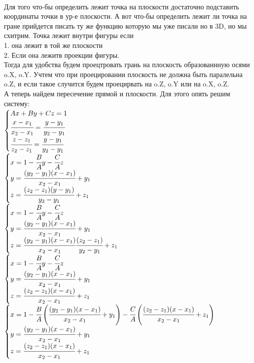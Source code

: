 \documentclass[12pt]{article} %
\begin{document}
    \\
    Для того что-бы определить лежит точка на плоскости достаточно подставить координаты точки в ур-е плоскости. А вот что-бы определить лежит ли точка на гране прийдется писать ту же функцию которую мы уже писали но в 3D, но мы схитрим. Точка лежит внутри фигуры если\\ \hspace*{2cm} 1. она лежит в той же плоскости \\  \hspace*{2cm} 2. Если она лежитв проекции фигуры.\\ Тогда для удобства будем проецтровать грань на плоскость образованнную осями o.X, o.Y. Учтем что при проецировании плоскость не должна быть паралельна o.Z, и если такое случится будем проецирвать на o.Z, o.Y или на o.X, o.Z.\\
    \hspace*{1cm} А теперь найдем пересечение прямой и плоскости. Для этого опять решим систему: \\ $ \begin{cases}Ax + By + Cz = 1 \\ \cfrac{x-x_1}{x_2 - x_1} = \cfrac{y-y_1}{y_2 - y_1} \\ \cfrac{z-z_1}{z_2 - z_1} = \cfrac{y-y_1}{y_2 - y_1}  \end{cases}$\\
    $ \begin{cases}x = 1 - \cfrac{B}{A}y - \cfrac{C}{A}z  \\  y = \cfrac{(y_2 - y_1)(x-x_1)}{x_2 - x_1} + y_1 \\ z = \cfrac{(z_2 - z_1)(y-y_1)}{y_2 - y_1} + z_1  \end{cases}$\\
    $ \begin{cases}x = 1 - \cfrac{B}{A}y - \cfrac{C}{A}z  \\  y = \cfrac{(y_2 - y_1)(x-x_1)}{x_2 - x_1} + y_1 \\ z = \cfrac{(y_2 - y_1)(x-x_1)}{x_2 - x_1}\cfrac{(z_2 - z_1)}{y_2 - y_1} + z_1  \end{cases}$\\
     $ \begin{cases}x = 1 - \cfrac{B}{A}y - \cfrac{C}{A}z  \\  y = \cfrac{(y_2 - y_1)(x-x_1)}{x_2 - x_1} + y_1 \\ z = \cfrac{(z_2 - z_1)(x-x_1)}{x_2 - x_1} + z_1  \end{cases}$\\
     $ \begin{cases}x = 1 - \cfrac{B}{A}\left(\cfrac{(y_2 - y_1)(x-x_1)}{x_2 - x_1} + y_1\right) - \cfrac{C}{A}\left(\cfrac{(z_2 - z_1)(x-x_1)}{x_2 - x_1} + z_1\right)  \\  y = \cfrac{(y_2 - y_1)(x-x_1)}{x_2 - x_1} + y_1 \\ z =  \cfrac{(z_2 - z_1)(x-x_1)}{x_2 - x_1} + z_1 \end{cases}$ \\
\end{document}

